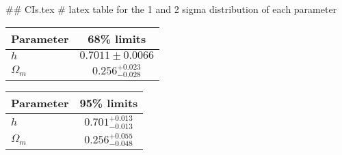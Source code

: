 ## CIs.tex
# latex table for the 1 and 2 sigma distribution of each parameter

\begin{tabular} { l  c}
 Parameter &  68\% limits\\
\hline
{\boldmath$h              $} & $0.7011\pm 0.0066          $\\
{\boldmath$\Omega_m       $} & $0.256^{+0.023}_{-0.028}   $\\
\hline
\end{tabular}

\begin{tabular} { l  c}
 Parameter &  95\% limits\\
\hline
{\boldmath$h              $} & $0.701^{+0.013}_{-0.013}   $\\
{\boldmath$\Omega_m       $} & $0.256^{+0.055}_{-0.048}   $\\
\hline
\end{tabular}
